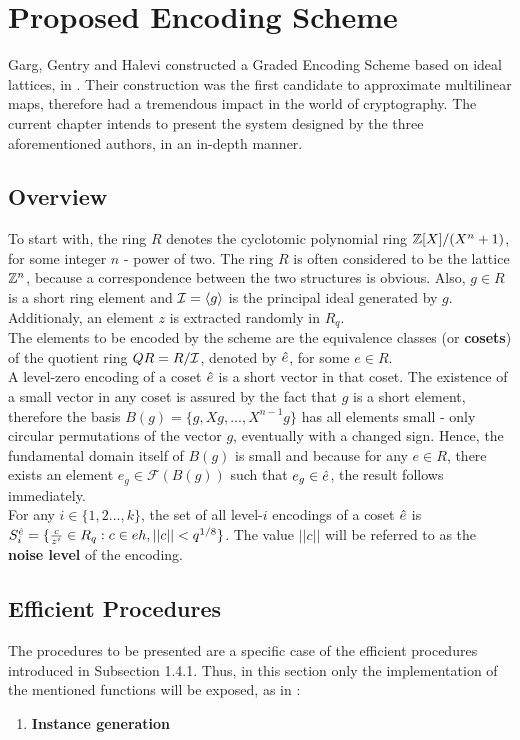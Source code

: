 \chapter{Proposed Encoding Scheme}

Garg, Gentry and Halevi constructed a Graded Encoding Scheme based on ideal lattices, in \cite{GGH13}. Their construction was the first candidate to approximate multilinear maps, therefore had a tremendous impact in the world of cryptography. The current chapter intends to present the system designed by the three aforementioned authors, in an in-depth manner. 

\section{Overview}

To start with, the ring $R$ denotes the cyclotomic polynomial ring ${\mathbb Z}[X]/(X^n +1)$, for some integer $n$ - power of two. The ring $R$ is often considered to be the lattice ${\mathbb Z}^n$, because a correspondence between the two structures is obvious. Also, $g \in R$ is a short ring element and $\mathcal{I} = \langle g \rangle$ is the principal ideal generated by $g$. Additionaly, an element $z$ is extracted randomly in $R_q$. \\

The elements to be encoded by the scheme are the equivalence classes (or \textbf{cosets}) of the quotient ring $QR = R / \mathcal{I}$, denoted by $\hat{e}$, for some $e \in R$. \\

A level-zero encoding of a coset $\hat{e}$ is a short vector in that coset. The existence of a small vector in any coset is assured by the fact that $g$ is a short element, therefore the basis $B(g) = \{g, Xg,...,X^{n-1}g\}$ has all elements small - only circular permutations of the vector $g$, eventually with a changed sign. Hence, the fundamental domain itself of $B(g)$ is small and because for any $e \in R$, there exists an element $e_g \in \mathcal{F}(B(g))$ such that $e_g \in \hat{e}$, the result follows immediately.\\

For any $i \in \{1,2...,k\}$, the set of all level-$i$ encodings of a coset $\hat{e}$ is $S_i^{\hat{e}} = \{\frac{c}{z^i}\in R_q : c \in eh, ||c|| < q^{1/8}\}$. The value $||c||$ will be referred to as the \textbf{noise level} of the encoding.\\

\section{Efficient Procedures}

The procedures to be presented are a specific case of the efficient procedures introduced in Subsection 1.4.1. Thus, in this section only the implementation of the mentioned functions will be exposed, as in \cite{GGH13}:

\begin{enumerate}
	\item \textbf{Instance generation}
\end{enumerate}